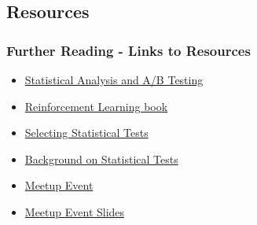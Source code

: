 \documentclass[]{beamer}
\theoremstyle{definition}
\begin{document}
\subsection{Resources}

\begin{frame}
\frametitle{Further Reading - Links to Resources}
\begin{itemize}
\item \href{http://20bits.com/article/statistical-analysis-and-ab-testing}{Statistical Analysis and A/B Testing}
\item \href{http://www.amazon.com/Reinforcement-Learning-Introduction-Adaptive-Computation/dp/0262193981}{Reinforcement Learning book}
\item \href{http://www.socialresearchmethods.net/selstat/ssstart.htm}{Selecting Statistical Tests}
\item \href{http://www.graphpad.com/support/faqid/1790/}{Background on Statistical Tests}
\item \href{http://www.meetup.com/NYData/events/160722942/?_af_eid=160722942&a=uc1_te&_af=event}{Meetup Event}
\item \href{http://chrishalpert.com/NYDW\%20Bandit\%20Presentation.ppsx}{Meetup Event Slides}
\end{itemize}
\end{frame}
\end{document}
